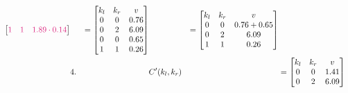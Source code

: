 \begin{figure}[H]
\begin{alignat*}{5}
\begin{bmatrix}
                                                                                                                                                               \color{blind-purple}1    & \color{blind-purple}1    & \mathcolor{blind-purple}{1.89 \cdot 0.14}    \\
                                                                                                                                                           \end{bmatrix}
         &         & = \begin{bmatrix}
                           k_l & k_r & v    \\
                           0   & 0   & 0.76 \\
                           0   & 2   & 6.09 \\
                           0   & 0   & 0.65 \\
                           1   & 1   & 0.26 \\
                       \end{bmatrix}       &                & = \begin{bmatrix}
                                                                    k_l & k_r & v           \\
                                                                    0   & 0   & 0.76 + 0.65 \\
                                                                    0   & 2   & 6.09        \\
                                                                    1   & 1   & 0.26        \\
                                                                \end{bmatrix}
        \\
         & 4.      &                           & C'(k_l, k_r)   &                                                                                      & = \begin{bmatrix}
                                                                                                                                                               k_l & k_r & v    \\
                                                                                                                                                               0   & 0   & 1.41 \\
                                                                                                                                                               0   & 2   & 6.09 \\

\end{bmatrix}
\end{alignat*}
\end{figure}
